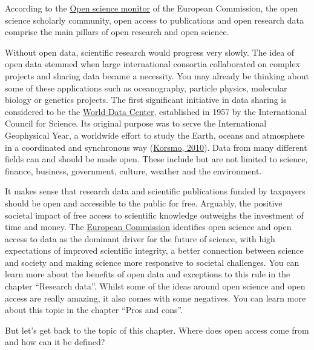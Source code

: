 \documentclass[
]{book}
\begin{document}
According to the \href{https://ec.europa.eu/info/research-and-innovation/strategy/strategy-2020-2024/our-digital-future/open-science/open-science-monitor_en}{Open science monitor} of the European Commission, the open science scholarly community, open access to publications and open research data comprise the main pillars of open research and open science.

Without open data, scientific research would progress very slowly. The idea of open data stemmed when large international consortia collaborated on complex projects and sharing data became a necessity. You may already be thinking about some of these applications such as oceanography, particle physics, molecular biology or genetics projects. The first significant initiative in data sharing is considered to be the \href{http://wdc.org.ua/}{World Data Center}, established in 1957 by the International Council for Science. Its original purpose was to serve the International Geophysical Year, a worldwide effort to study the Earth, oceans and atmosphere in a coordinated and synchronous way (\href{https://www.researchgate.net/publication/270166513_The_Origins_and_Principles_of_the_World_Data_Center_System}{Korsmo, 2010}). Data from many different fields can and should be made open. These include but are not limited to science, finance, business, government, culture, weather and the environment.

It makes sense that research data and scientific publications funded by taxpayers should be open and accessible to the public for free. Arguably, the positive societal impact of free access to scientific knowledge outweighs the investment of time and money. The \href{https://ec.europa.eu/info/research-and-innovation/strategy/strategy-2020-2024/our-digital-future/open-science_en}{European Commission} identifies open science and open access to data as the dominant driver for the future of science, with high expectations of improved scientific integrity, a better connection between science and society and making science more responsive to societal challenges. You can learn more about the benefits of open data and exceptions to this rule in the chapter ``Research data''. Whilst some of the ideas around open science and open access are really amazing, it also comes with some negatives. You can learn more about this topic in the chapter ``Pros and cons''.

But let's get back to the topic of this chapter. Where does open access come from and how can it be defined?
\end{document}
